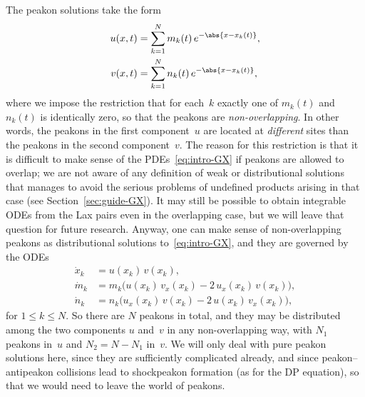 \documentclass[10pt,a4paper]{article} \pdfoutput=1 
\begin{document}
The peakon solutions take the form
\begin{equation}
  \label{eq:GX-peakons}
  \begin{split}
    u(x,t) &= \sum_{k=1}^N m_k(t) \, e^{-\abs{x - x_k(t)}}
    , \\
    v(x,t) &= \sum_{k=1}^N n_k(t) \, e^{-\abs{x - x_k(t)}}
    ,
  \end{split}
\end{equation}
where we impose the restriction that for each~$k$ exactly one of $m_k(t)$ and $n_k(t)$
is identically zero, so that the peakons are \emph{non-overlapping}.
In other words, the peakons in the first component~$u$ are located at \emph{different} sites
than the peakons in the second component~$v$.
The reason for this restriction is that it is difficult to make sense of the PDEs~\eqref{eq:intro-GX}
if peakons are allowed to overlap; we are not aware of any definition of weak or distributional solutions
that manages to avoid the serious problems of undefined products arising in that case
(see Section~\ref{sec:guide-GX}).
It may still be possible to obtain integrable ODEs from the Lax pairs
even in the overlapping case, but we will leave that question for future research.
Anyway, one can make sense of non-overlapping peakons as distributional solutions to~\eqref{eq:intro-GX},
and they are governed by the ODEs
\begin{equation}
  \label{eq:GX-peakon-ode}
  \begin{split}
    \dot x_k &= u(x_k) \, v(x_k)
    ,\\
    \dot m_k &= m_k \bigl( u(x_k) \, v_x(x_k) - 2 \, u_x(x_k) \, v(x_k) \bigr)
    ,\\
    \dot n_k &= n_k \bigl( u_x(x_k) \, v(x_k) - 2 \, u(x_k) \, v_x(x_k) \bigr)
    ,
  \end{split}
\end{equation}
for $1 \le k \le N$.
So there are $N$ peakons in total, and they may be distributed among the two components
$u$ and~$v$ in any non-overlapping way, with $N_1$ peakons in~$u$ and $N_2 = N-N_1$ in~$v$.
We will only deal with pure peakon solutions here, since they are sufficiently complicated already,
and since peakon--antipeakon collisions lead to shockpeakon formation (as for the DP equation),
so that we would need to leave the world of peakons.
\end{document}
